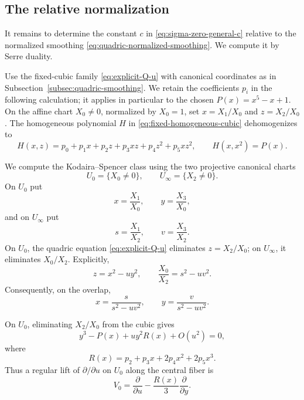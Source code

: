 \documentclass[11pt]{article}
\begin{document}
\subsection{The relative normalization}
\label{subsec:relative-normalization}

It remains to determine the constant $c$ in
{\eqref{eq:sigma-zero-general-c}} relative to the normalized smoothing
\eqref{eq:quadric-normalized-smoothing}. We compute it by Serre duality.

\begingroup
Use the fixed-cubic family \eqref{eq:explicit-Q-u} with canonical
coordinates as in Subsection~\ref{subsec:quadric-smoothing}. We retain
the coefficients $p_i$ in the following calculation; it applies in
particular to the chosen $P(x)=x^5-x+1$. On the affine chart $X_0\neq0$, normalized by $X_0=1$, set
$x=X_1/X_0$ and $z=X_2/X_0$.
The homogeneous polynomial $H$ in
\eqref{eq:fixed-homogeneous-cubic} dehomogenizes to
\[
H(x,z)=p_0+p_1x+p_2z+p_3xz+p_4z^2+p_5xz^2,
\qquad H(x,x^2)=P(x).
\]
\endgroup


We compute the Kodaira--Spencer class using the two projective
canonical charts
\begin{equation*}
U_0=\{X_0\neq0\},
\qquad
U_\infty=\{X_2\neq0\}.
\end{equation*}
On $U_0$ put
\begin{equation*}
x=\frac{X_1}{X_0},
\qquad
y=\frac{X_3}{X_0},
\end{equation*}
and on $U_\infty$ put
\begin{equation*}
s=\frac{X_1}{X_2},
\qquad
v=\frac{X_3}{X_2}.
\end{equation*}
{On $U_0$, the quadric equation
\eqref{eq:explicit-Q-u} eliminates $z=X_2/X_0$;
on $U_\infty$, it eliminates $X_0/X_2$. Explicitly,}
\begingroup
\[
z=x^2-uy^2,
\qquad
\frac{X_0}{X_2}=s^2-uv^2.
\]
\endgroup
{Consequently, on the overlap,}
\begin{equation}
\label{eq:projective-transition-u}
x=\frac{s}{s^2-uv^2},
\qquad
y=\frac{v}{s^2-uv^2}.
\end{equation}

On $U_0$, eliminating $X_2/X_0$ from the cubic gives
\begin{equation*}
y^3-P(x)+uy^2R(x)+O(u^2)=0,
\end{equation*}
where
\begin{equation*}
R(x)=p_2+p_3x+2p_4x^2+2p_5x^3.
\end{equation*}
Thus a regular lift of $\partial/\partial u$ on $U_0$ {along the central fiber} is
\begin{equation}
\label{eq:lift-U0}
V_0
=
\frac{\partial}{\partial u}
-\frac{R(x)}{3}\frac{\partial}{\partial y}.
\end{equation}
\end{document}
